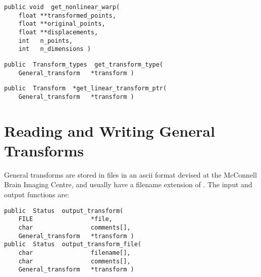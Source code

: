 {\bf\begin{verbatim}
public void  get_nonlinear_warp(
    float **transformed_points,
    float **original_points,
    float **displacements,
    int   n_points,
    int   n_dimensions )
\end{verbatim}}


{\bf\begin{verbatim}
public  Transform_types  get_transform_type(
    General_transform   *transform )
\end{verbatim}}


{\bf\begin{verbatim}
public  Transform  *get_linear_transform_ptr(
    General_transform   *transform )
\end{verbatim}}


\section{Reading and Writing General Transforms}

General transforms are stored in files in an ascii format devised at
the McConnell Brain Imaging Centre, and usually have a filename
extension of .  The input and output functions are:

{\bf\begin{verbatim}
public  Status  output_transform(
    FILE                *file,
    char                comments[],
    General_transform   *transform )
public  Status  output_transform_file(
    char                filename[],
    char                comments[],
    General_transform   *transform )
\end{verbatim}}


